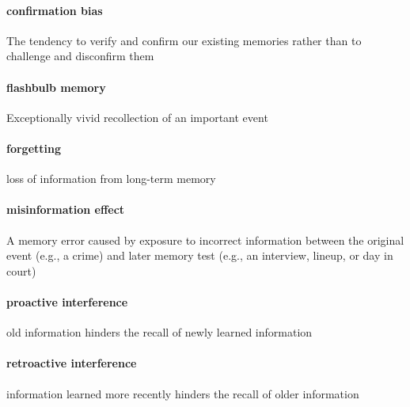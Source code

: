 \documentclass[
]{krantz}
\begin{document}
\paragraph*{confirmation bias}\label{confirmation-bias}

The tendency to verify and confirm our existing memories rather than to challenge and disconfirm them

\paragraph*{flashbulb memory}\label{flashbulb-memory}

Exceptionally vivid recollection of an important event

\paragraph*{forgetting}\label{forgetting-1}

loss of information from long-term memory

\paragraph*{misinformation effect}\label{misinformation-effect-1}

A memory error caused by exposure to incorrect information between the original event (e.g., a crime) and later memory test (e.g., an interview, lineup, or day in court)

\paragraph*{proactive interference}\label{proactive-interference}

old information hinders the recall of newly learned information

\paragraph*{retroactive interference}\label{retroactive-interference}

information learned more recently hinders the recall of older information
\end{document}
